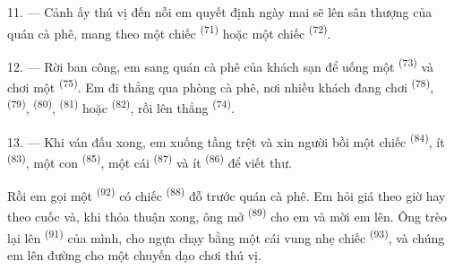 \VUsaut{3.0mm}
\VUsaut{3.0mm}

11. --- Cảnh ấy thú vị đến nỗi em quyết định ngày mai sẽ lên sân thượng của quán cà phê,
mang theo một chiếc  \textsuperscript{(71)} hoặc một chiếc  \textsuperscript{(72)}.

12. --- Rời ban công, em sang quán cà phê của khách sạn để uống một 
\textsuperscript{(73)} và chơi một  \textsuperscript{(75)}. Em đi thẳng
qua phòng cà phê, nơi nhiều khách đang chơi  \textsuperscript{(78)},
 \textsuperscript{(79)},  \textsuperscript{(80)},
 \textsuperscript{(81)} hoặc  \textsuperscript{(82)}, rồi
lên thẳng  \textsuperscript{(74)}.

13. --- Khi ván đấu xong, em xuống tầng trệt và xin người bồi một chiếc 
\textsuperscript{(84)}, ít  \textsuperscript{(83)}, một con 
\textsuperscript{(85)}, một cái  \textsuperscript{(87)} và ít
 \textsuperscript{(86)} để viết thư.

Rồi em gọi một  \textsuperscript{(92)} có chiếc 
\textsuperscript{(88)} đỗ trước quán cà phê. Em hỏi giá theo giờ hay theo cuốc và, khi
thỏa thuận xong, ông mở  \textsuperscript{(89)} cho em và mời em lên. Ông
trèo lại lên  \textsuperscript{(91)} của mình, cho ngựa chạy bằng một
cái vung nhẹ chiếc  \textsuperscript{(93)}, và chúng em lên đường cho một
chuyến dạo chơi thú vị.
\VUsaut{6.0mm}
\VUfilet{22mm}

